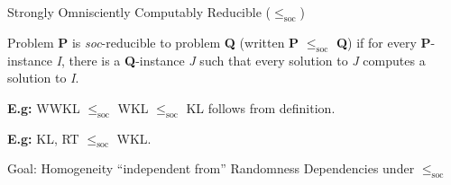 \begin{frame}{Strongly Omnisciently Computably Reducible
($\leq_{\text{soc}}$)}
  \begin{define*}
    Problem \textbf{P} is \textit{soc}-reducible to problem \textbf{Q}
    (written \textbf{P} $\leq_{\text{soc}}$ \textbf{Q}) if for every
    \textbf{P}-instance \textit{I}, there is a \textbf{Q}-instance
    \textit{J} such that every solution to \textit{J} computes a solution
    to \textit{I}.
  \end{define*}

  \vspace{2em}
  \textbf{E.g:} WWKL $\leq_{\text{soc}}$ WKL $\leq_{\text{soc}}$ KL follows
  from definition.

  \vspace{2em}
  \textbf{E.g:} KL, RT $\leq_{\text{soc}}$ WKL.
\end{frame}

\begin{frame}{Goal: Homogeneity ``independent from'' Randomness}
  Dependencies under $\leq_{\text{soc}}$

  \vspace{2em}
  \begin{center}
  \end{center}
\end{frame}

